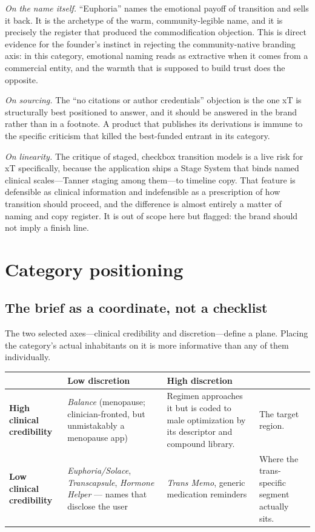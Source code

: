 \documentclass[11pt,a4paper]{article}
\newcommand{\bad}[1]{\obs{#1}}
\begin{document}
\emph{On the name itself.} ``Euphoria'' names the emotional payoff of
transition and sells it back. It is the archetype of the warm,
community-legible name, and it is precisely the register that produced
the commodification objection. This is direct evidence for the
founder's instinct in rejecting the community-native branding axis: in
this category, emotional naming reads as extractive when it comes from
a commercial entity, and the warmth that is supposed to build trust
does the opposite.

\emph{On sourcing.} The ``no citations or author credentials''
objection is the one xT is structurally best positioned to answer, and
it should be answered in the brand rather than in a footnote. A product
that publishes its derivations is immune to the specific criticism that
killed the best-funded entrant in its category.

\emph{On linearity.} The critique of staged, checkbox transition models
is a live risk for xT specifically, because the application ships a
Stage System that binds named clinical scales---Tanner staging among
them---to timeline copy. That feature is defensible as clinical
information and indefensible as a prescription of how transition
should proceed, and the difference is almost entirely a matter of
naming and copy register. It is out of scope here but flagged: the
brand should not imply a finish line.

\section{Category positioning}
\label{sec:positioning}

\subsection{The brief as a coordinate, not a checklist}
\label{sec:brief}

The two selected axes---clinical credibility and discretion---define a
plane. Placing the category's actual inhabitants on it is more
informative than any of them individually.

\begin{longtable}{@{}L{3.4cm}L{3.5cm}L{3.5cm}L{4.6cm}@{}}
\toprule
& \textbf{Low discretion} & \textbf{High discretion} & \\
\midrule
\endhead
\textbf{High clinical credibility} &
\emph{Balance} (menopause; clinician-fronted, but unmistakably a
menopause app) &
\bad{Largely vacant.} Regimen approaches it but is coded to male
optimization by its descriptor and compound library. &
The target region. \\[0.6em]

\textbf{Low clinical credibility} &
\emph{Euphoria/Solace}, \emph{Transcapsule}, \emph{Hormone Helper} ---
names that disclose the user &
\emph{Trans Memo}, generic medication reminders &
Where the trans-specific segment actually sits. \\
\bottomrule
\end{longtable}
\end{document}
